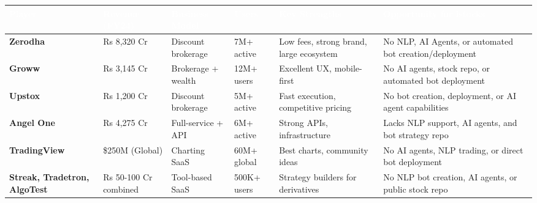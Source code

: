 \documentclass[11pt,a4paper]{article}
\begin{document}
\begin{longtable}{%
    >{\raggedright\arraybackslash}p{2.8cm}
    >{\raggedright\arraybackslash}p{2.5cm}
    >{\raggedright\arraybackslash}p{2.2cm}
    >{\raggedright\arraybackslash}p{2cm}
    >{\raggedright\arraybackslash}p{3.5cm}
    >{\raggedright\arraybackslash}p{5.5cm}
}
\toprule
\rowcolor{headerblue}
\textcolor{white}{\textbf{Player}} &
\textcolor{white}{\textbf{Revenue (FY24)}} &
\textcolor{white}{\textbf{Business Model}} &
\textcolor{white}{\textbf{Users}} &
\textcolor{white}{\textbf{Key Strengths}} &
\textcolor{white}{\textbf{Opportunity for istocks}} \\
\midrule
\endfirsthead

\rowcolor{lightgray}
\textbf{Zerodha} &
Rs 8,320 Cr &
Discount brokerage &
7M+ active &
Low fees, strong brand, large ecosystem &
No NLP, AI Agents, or automated bot creation/deployment \\

\textbf{Groww} &
Rs 3,145 Cr &
Brokerage + wealth &
12M+ users &
Excellent UX, mobile-first & No AI agents, stock repo, or automated bot deployment \\

\rowcolor{lightgray}
\textbf{Upstox} &
Rs 1,200 Cr &
Discount brokerage &
5M+ active &
Fast execution, competitive pricing &
No bot creation, deployment, or AI agent capabilities \\

\textbf{Angel One} &
Rs 4,275 Cr &
Full-service + API &
6M+ active &
Strong APIs, infrastructure &
Lacks NLP support, AI agents, and bot strategy repo \\

\rowcolor{lightgray}
\textbf{TradingView} &
\$250M (Global) &
Charting SaaS &
60M+ global &
Best charts, community ideas &
No AI agents, NLP trading, or direct bot deployment \\

\textbf{Streak, Tradetron, AlgoTest} &
Rs 50-100 Cr combined &
Tool-based SaaS &
500K+ users &
Strategy builders for derivatives &
No NLP bot creation, AI agents, or public stock repo \\

\bottomrule
\end{longtable}

\vspace{0.8em}

\end{document}
